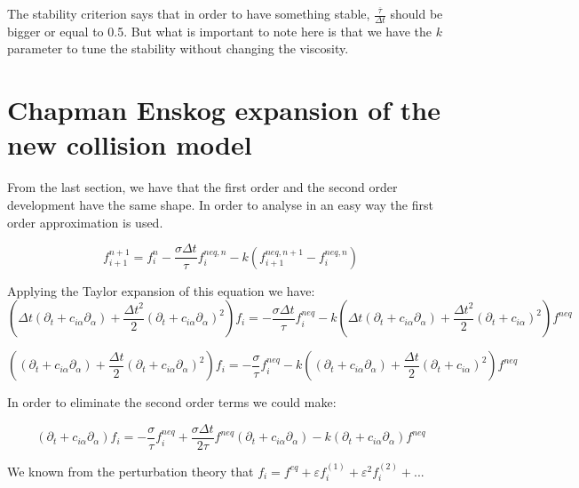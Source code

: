 \documentclass{article}
\begin{document}
The stability criterion says that in order to have something stable, $\frac{\overline{\tau}}{\Delta t}$ should be bigger or equal to 0.5.
But what is important to note here is that we have the $k$ parameter to tune the stability without changing the viscosity.

\section{Chapman Enskog expansion of the new collision model}
From the last section, we have that the first order and the second order development have the same shape. In order to analyse in an easy way the first order approximation is
used.

\begin{equation}
    f_{i+1}^{n+1} =f_{i}^{n} -\frac{\sigma\Delta t}{\tau } f_{i}^{neq,n} -k\left( f_{i+1}^{neq,n+1} -f_{i}^{neq,n}\right)
\end{equation}

Applying the Taylor expansion of this equation we have:
\begin{equation}
    \left( \Delta t( \partial _{t} +c_{i\alpha } \partial _{\alpha }) +\frac{\Delta t^{2}}{2}( \partial _{t} +c_{i\alpha } \partial _{\alpha })^{2}\right) f_{i} = -\frac{\sigma\Delta t}{\tau } f_{i}^{neq} -k\left( \Delta t( \partial _{t} +c_{i\alpha } \partial _{\alpha }) +\frac{\Delta t^{2}}{2}( \partial _{t} +c_{i\alpha })^{2}\right) f^{neq}
\end{equation}

\begin{equation*}
    \left(( \partial _{t} +c_{i\alpha } \partial _{\alpha }) +\frac{\Delta t}{2}( \partial _{t} +c_{i\alpha } \partial _{\alpha })^{2}\right) f_{i} = -\frac{\sigma}{\tau } f_{i}^{neq} -k\left(( \partial _{t} +c_{i\alpha } \partial _{\alpha }) +\frac{\Delta t}{2}( \partial _{t} +c_{i\alpha })^{2}\right) f^{neq}
\end{equation*}

In order to eliminate the second order terms we could make:

\begin{equation}
    ( \partial _{t} +c_{i\alpha } \partial _{\alpha }) f_{i} = -\frac{\sigma}{\tau } f_{i}^{neq} +\frac{\sigma\Delta t}{2\tau } f^{neq}( \partial _{t} +c_{i\alpha } \partial _{\alpha }) -k( \partial _{t} +c_{i\alpha } \partial _{\alpha }) f^{neq}
\end{equation}

We known from the perturbation theory that $f_{i} =f^{eq} +\varepsilon f_{i}^{( 1)} +\varepsilon ^{2} f_{i}^{( 2)} +...$
\end{document}
